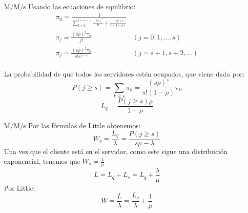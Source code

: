 \begin{frame}{M/M/s}
	Usando las ecuaciones de equilibrio:
	$$\begin{array}{cc}
	\pi_0=\displaystyle\frac{1}{\displaystyle \sum_{t=0}^{t=s-1}\frac{(s\rho)^t}{t!}+\frac{(s\rho)s}{s!(1-\rho)}} & \\
	\pi_j=\displaystyle\frac{(s\rho)^j\pi_0}{j!} & (j=0,1,...,s)\\
	\pi_j=\displaystyle\frac{(s\rho)^j\pi_0}{s!s^{j-s}} & (j=s+1,s+2,...)\\
	\end{array}$$
	
	\pause
	La probabilidad de que todos los servidores est\'en ocupados, que viene dada por:
	$$P(j\geq s)=\sum_{k\geq s}^{}\pi_k=\frac{(s\rho)^s}{s!(1-\rho)}\pi_0$$
	$$L_q=\frac{P(j\geq s)\rho}{1-\rho}$$
\end{frame}

\begin{frame}{M/M/s}
	Por las fórmulas de Little obtenemos:		$$W_q=\frac{L_q}{\lambda}=\frac{P(j\geq s)}{s\mu-\lambda}$$
	\pause
	Una vez que el cliente est\'a en el servidor, como este sigue una distribuci\'on exponencial, tenemos que $W_s=\frac{1}{\mu}$ \pause
	$$L=L_q+L_s=L_q+\frac{\lambda}{\mu}$$
	\pause
	Por Little:
	$$W=\frac{L}{\lambda}=\frac{L_q}{\lambda}+\frac{1}{\mu}$$
\end{frame}